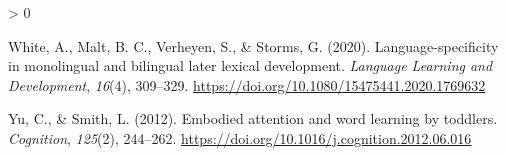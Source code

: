 \documentclass[
  english,
  ,man,floatsintext]{apa6}
\newlength{\cslhangindent}
\newenvironment{CSLReferences}[2] %
 {%
  \setlength{\parindent}{0pt}
  \ifodd #1 \everypar{\setlength{\hangindent}{\cslhangindent}}\ignorespaces\fi
  \ifnum #2 > 0
  \setlength{\parskip}{#2\baselineskip}
  \fi
 }%
 {}
\begin{document}
\begin{CSLReferences}{1}{0}
\leavevmode\hypertarget{ref-White_etal_2020}{}%
White, A., Malt, B. C., Verheyen, S., \& Storms, G. (2020). Language-specificity in monolingual and bilingual later lexical development. \emph{Language Learning and Development}, \emph{16}(4), 309--329. \url{https://doi.org/10.1080/15475441.2020.1769632}

\leavevmode\hypertarget{ref-Yu_Smith_2012}{}%
Yu, C., \& Smith, L. (2012). Embodied attention and word learning by toddlers. \emph{Cognition}, \emph{125}(2), 244--262. \url{https://doi.org/10.1016/j.cognition.2012.06.016}

\end{CSLReferences}

\endgroup
\end{document}
